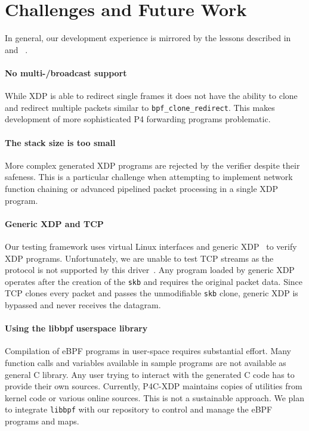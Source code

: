 \section{Challenges and Future Work}\label{sec:conclusions}
In general, our development experience is mirrored by the lessons described 
in~\cite{minao-hspr18} and ~\cite{bertin-netdev17}.

\paragraph{No multi-/broadcast support}
While XDP is able to redirect single frames it does not have the ability to 
clone and redirect multiple packets similar to \texttt{bpf\_clone\_redirect}. 
This makes development of more sophisticated P4 forwarding programs problematic.

\paragraph{The stack size is too small}
More complex generated XDP programs are rejected by the verifier despite their 
safeness. 
This is a particular challenge when attempting to implement network function 
chaining or advanced pipelined packet processing in a single XDP program. 

\paragraph{Generic XDP and TCP}
Our testing framework uses virtual Linux interfaces and generic 
XDP~\cite{genericxdp} to verify XDP programs. 
Unfortunately, we are unable to test TCP streams as the protocol is not 
supported by this driver~\cite{xdptcp}.
Any program loaded by generic XDP operates after the creation of
the \texttt{skb} and requires the original packet data. Since TCP clones every 
packet and passes the unmodifiable \texttt{skb} clone, generic XDP is
bypassed and never receives the datagram.

\paragraph{Using the libbpf userspace library}
Compilation of eBPF programs in user-space requires substantial 
effort. Many function calls and variables available in sample programs are not 
available as general C library. Any user trying to interact with the 
generated C code has to provide their own sources. Currently, P4C-XDP maintains 
copies of utilities from kernel code or various online sources. This is not a 
sustainable approach. We plan to integrate \texttt{libbpf} with our repository 
to control and manage the eBPF programs and maps.

